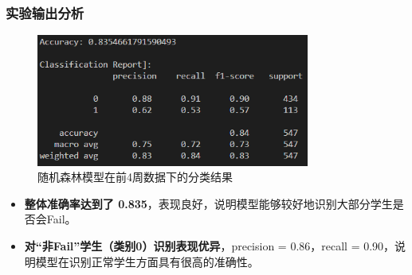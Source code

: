 \documentclass{SYSUReport}
\begin{document}
\subsubsection{实验输出分析}

\begin{figure}[htbp]
    \centering
    \includegraphics[width=0.8\textwidth]{figures/RandomForest_result.png}
    \caption{随机森林模型在前4周数据下的分类结果}
    \label{fig:randomforest_result}
\end{figure}

\begin{itemize}
    \item \textbf{整体准确率达到了 0.835}，表现良好，说明模型能够较好地识别大部分学生是否会Fail。
    \item \textbf{对“非Fail”学生（类别0）识别表现优异}，precision = 0.86，recall = 0.90，说明模型在识别正常学生方面具有很高的准确性。
\end{itemize}
\end{document}
